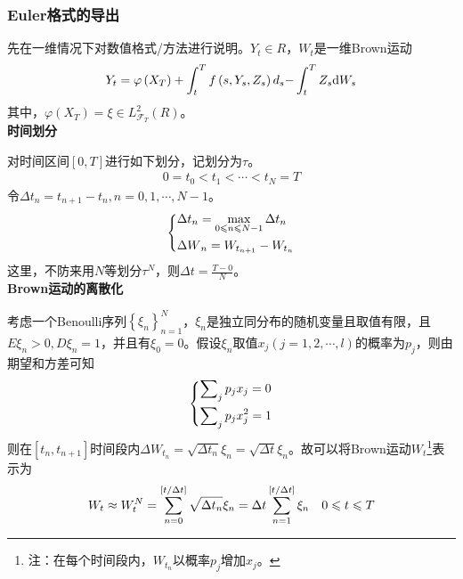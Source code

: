 		\subsubsection{Euler格式的导出}
			\par
			先在一维情况下对数值格式/方法进行说明。${Y_t} \in R$，$W_t$是一维Brown运动
					\begin{align}
					\centering
					{Y_t} = \varphi \left( {{X_T}} \right) + \int_t^T {f\left( {s,{Y_s},{Z_s}} \right){d_s} - } \int_t^T {{Z_s}\mathrm{d}{W_s}}
			 		\end{align}
			 其中，$\varphi ({X_T}) = \xi  \in L_{{\mathcal{F}}_T}^2(R)$。\\
			\textbf{时间划分}
			\par
			对时间区间$[0,T]$进行如下划分，记划分为$\tau$。
			\begin{align*}
			0 = {t_0} < {t_1} <  \cdots  < {t_N} = T
			\end{align*}
			令$\Delta {t_n} = {t_{n + 1}} - {t_n},n = 0,1, \cdots ,N - 1$。\\
				\begin{equation*}
					\centering
					\left\{
						\begin{lgathered}
						\Delta {t_n} = \max_{0 \leqslant n \leqslant N - 1} \Delta {t_n}\\
						\Delta W{_n} = W_{t_{n + 1}} - W_{t_n}
						\end{lgathered}
					\right.
				\end{equation*}
			 这里，不防来用$N$等划分$\tau^{N}$，则$\Delta t = \frac{{T - 0}}{N}$。\\
			 \textbf{Brown运动的离散化}
			 \par
			 考虑一个Benoulli序列$\left\{ {{\xi _n}} \right\}_{n = 1}^N$，${\xi _n}$是独立同分布的随机变量且取值有限，且$E{\xi _n} > 0,D{\xi _n} = 1$，并且有$\xi_0=0$。假设$\xi_n$取值$x_j(j=1,2,\cdots,l)$的概率为$p_j$，则由期望和方差可知
				\begin{equation*}
					\centering
					\left\{\begin{lgathered}
					{\sum\nolimits_j {{p_j}{x_j} = 0} }\\
					{\sum\nolimits_j {{p_j}x_j^2 = 1} }
					\end{lgathered} \right.
				\end{equation*}
			则在$[t_n,t_{n+1}]$时间段内$\Delta W_{t_n} = \sqrt {\Delta {t_n}} {\xi _n} = \sqrt {\Delta t} {\xi _n}$。故可以将Brown运动$W_t$\footnote{注：在每个时间段内，$W_{t_n}$以概率$p_j$增加$x_j$。}表示为
			 		\begin{equation*}
					\centering
					{W_t} \approx W_t^N = \sum\limits_{n = 0}^{\left[ {t/\Delta t} \right]} {\sqrt {\Delta {t_n}} {\xi _n}}  = \Delta t \sum\limits_{n = 1}^{\left[ {t/\Delta t} \right]} {{\xi _n}} \quad 0 \leqslant t \leqslant T
					\end{equation*}
